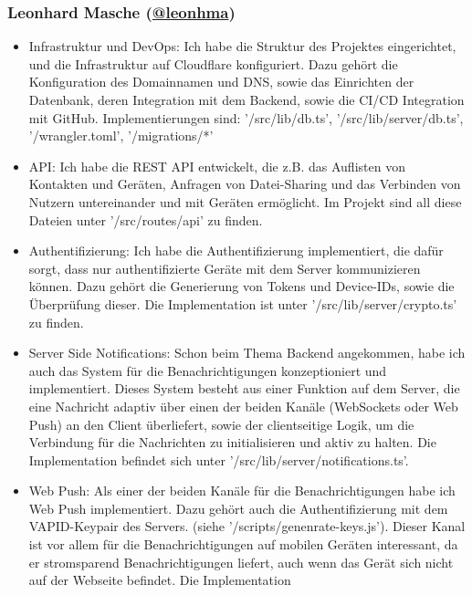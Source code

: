 \documentclass[a4paper]{article}
\begin{document}
\subsubsection{Leonhard Masche (\href{https://github.com/leonhma}{@leonhma})}
\begin{itemize}
  \item Infrastruktur und DevOps: Ich habe die Struktur des Projektes
        eingerichtet, und die Infrastruktur auf Cloudflare konfiguriert. Dazu
        gehört die Konfiguration des Domainnamen und DNS, sowie das Einrichten
        der Datenbank, deren Integration mit dem Backend, sowie die CI/CD
        Integration mit GitHub. Implementierungen sind: '/src/lib/db.ts',
        '/src/lib/server/db.ts', '/wrangler.toml', '/migrations/*'
  \item API: Ich habe die REST API entwickelt, die z.B. das Auflisten von
        Kontakten und Geräten, Anfragen von Datei-Sharing und das Verbinden von
        Nutzern untereinander und mit Geräten ermöglicht. Im Projekt sind all
        diese Dateien unter '/src/routes/api' zu finden.
  \item Authentifizierung: Ich habe die Authentifizierung implementiert, die
        dafür sorgt, dass nur authentifizierte Geräte mit dem Server
        kommunizieren können. Dazu gehört die Generierung von Tokens und
        Device-IDs, sowie die Überprüfung dieser. Die Implementation ist unter
        '/src/lib/server/crypto.ts' zu finden.
  \item Server Side Notifications: Schon beim Thema Backend angekommen, habe ich
        auch das System für die Benachrichtigungen konzeptioniert und
        implementiert. Dieses System besteht aus einer Funktion auf dem Server,
        die eine Nachricht adaptiv über einen der beiden Kanäle (WebSockets oder
        Web Push) an den Client überliefert, sowie der clientseitige Logik, um
        die Verbindung für die Nachrichten zu initialisieren und aktiv zu
        halten. Die Implementation befindet sich unter
        '/src/lib/server/notifications.ts'.
  \item Web Push: Als einer der beiden Kanäle für die Benachrichtigungen habe
        ich Web Push implementiert. Dazu gehört auch die Authentifizierung mit
        dem VAPID-Keypair des Servers. (siehe '/scripts/genenrate-keys.js').
        Dieser Kanal ist vor allem für die Benachrichtigungen auf mobilen
        Geräten interessant, da er stromsparend Benachrichtigungen liefert, auch
        wenn das Gerät sich nicht auf der Webseite befindet. Die Implementation

\end{itemize}
\end{document}
